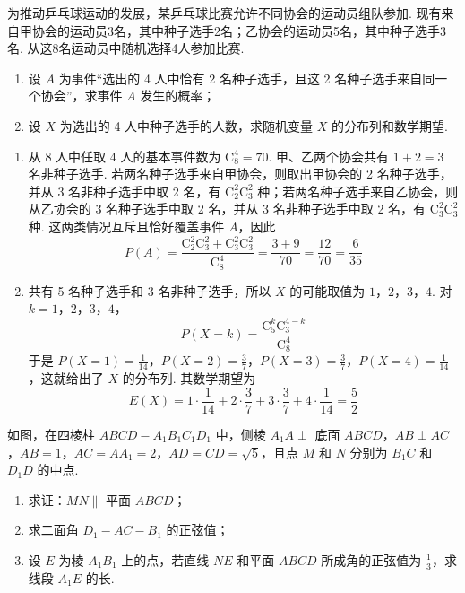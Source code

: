 \begin{problem}
为推动乒乓球运动的发展，某乒乓球比赛允许不同协会的运动员组队参加. 现有来自甲协会的运动员3名，其中种子选手2名；乙协会的运动员5名，其中种子选手3名. 从这8名运动员中随机选择4人参加比赛.

\begin{enumerate}
\item 设 \(A\) 为事件“选出的 4 人中恰有 2 名种子选手，且这 2 名种子选手来自同一个协会”，求事件 \(A\) 发生的概率；
\item 设 \(X\) 为选出的 4 人中种子选手的人数，求随机变量 \(X\) 的分布列和数学期望.
\end{enumerate}
\end{problem}

\begin{solution}
\begin{enumerate}
\item 从 8 人中任取 4 人的基本事件数为 \(\mathrm C_8^4=70\). 甲、乙两个协会共有 \(1+2=3\) 名非种子选手. 若两名种子选手来自甲协会，则取出甲协会的 2 名种子选手，并从 3 名非种子选手中取 2 名，有 \(\mathrm C_2^2\mathrm C_3^2\) 种；若两名种子选手来自乙协会，则从乙协会的 3 名种子选手中取 2 名，并从 3 名非种子选手中取 2 名，有 \(\mathrm C_3^2\mathrm C_3^2\) 种. 这两类情况互斥且恰好覆盖事件 \(A\)，因此
\[
P(A)=\frac{\mathrm C_2^2\mathrm C_3^2+\mathrm C_3^2\mathrm C_3^2}{\mathrm C_8^4}=\frac{3+9}{70}=\frac{12}{70}=\frac6{35}
\]
\item 共有 5 名种子选手和 3 名非种子选手，所以 \(X\) 的可能取值为 \(1\)，\(2\)，\(3\)，\(4\). 对 \(k=1\)，\(2\)，\(3\)，\(4\)，
\[
P(X=k)=\frac{\mathrm C_5^k\mathrm C_3^{4-k}}{\mathrm C_8^4}
\]
于是 \(P(X=1)=\frac1{14}\)，\(P(X=2)=\frac37\)，\(P(X=3)=\frac37\)，\(P(X=4)=\frac1{14}\)，这就给出了 \(X\) 的分布列. 其数学期望为
\[
E(X)=1\cdot\frac1{14}+2\cdot\frac37+3\cdot\frac37+4\cdot\frac1{14}=\frac52
\]
\end{enumerate}
\end{solution}

\begin{problem}
如图，在四棱柱 \(ABCD - A_{1}B_{1}C_{1}D_{1}\) 中，侧棱 \(A_{1}A \perp\) 底面 \(ABCD\)，\(AB \perp AC\)，\(AB = 1\)，\(AC = AA_{1} = 2\)，\(AD = CD = \sqrt{5}\)，且点 \(M\) 和 \(N\) 分别为 \(B_{1}C\) 和 \(D_{1}D\) 的中点.

\begin{enumerate}
\item 求证：\(MN \parallel\) 平面 \(ABCD\)；
\item 求二面角 \(D_{1} - AC - B_{1}\) 的正弦值；
\item 设 \(E\) 为棱 \(A_{1}B_{1}\) 上的点，若直线 \(NE\) 和平面 \(ABCD\) 所成角的正弦值为 \(\frac{1}{3}\)，求线段 \(A_{1}E\) 的长.
\end{enumerate}
\end{problem}

